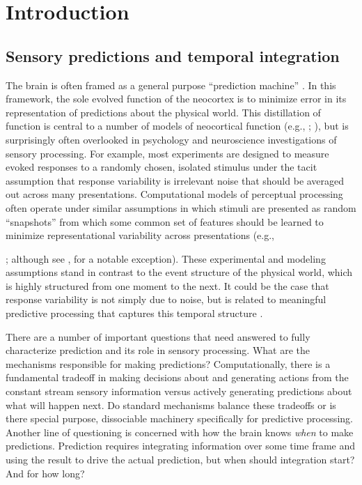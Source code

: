 \documentclass[dwyatte_dissertation.tex]{subfiles}
\begin{document}
\sloppy

\chapter{Introduction}
\label{chap:intro}

\section{Sensory predictions and temporal integration}
The brain is often framed as a general purpose ``prediction machine'' \cite{HawkinsBlakeslee04,Clark13}. In this framework, the sole evolved function of the neocortex is to minimize error in its representation of predictions about the physical world. This distillation of function is central to a number of models of neocortical function (e.g., ; ), but is surprisingly often overlooked in psychology and neuroscience investigations of sensory processing. For example, most experiments are designed to measure evoked responses to a randomly chosen, isolated stimulus under the tacit assumption that response variability is irrelevant noise that should be averaged out across many presentations. Computational models of perceptual processing often operate under similar assumptions in which stimuli are presented as random ``snapshots'' from which some common set of features should be learned to minimize representational variability across presentations (e.g., {; although see , for a notable exception). These experimental and modeling assumptions stand in contrast to the event structure of the physical world, which is highly structured from one moment to the next. It could be the case that response variability is not simply due to noise, but is related to meaningful predictive processing that captures this temporal structure \cite{ArieliSterkinGrinvaldEtAl96,WilderJonesAhmedEtAl13,FischerWhitney14}.

There are a number of important questions that need answered to fully characterize prediction and its role in sensory processing. What are the mechanisms responsible for making predictions? Computationally, there is a fundamental tradeoff in making decisions about and generating actions from the constant stream sensory information versus actively generating predictions about what will happen next. Do standard mechanisms balance these tradeoffs or is there special purpose, dissociable machinery specifically for predictive processing. Another line of questioning is concerned with how the brain knows \textit{when} to make predictions. Prediction requires integrating information over some time frame and using the result to drive the actual prediction, but when should integration start? And for how long? 

}
\end{document}

